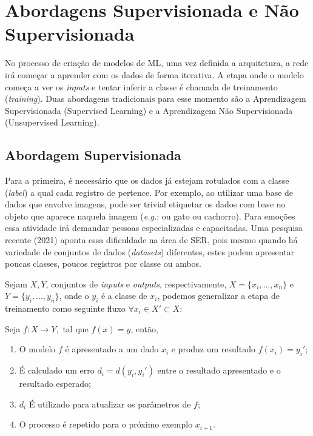 \section{Abordagens Supervisionada e Não Supervisionada}\label{sec:spvsup}

No processo de criação de modelos de \acrshort{ML}, uma vez definida a arquitetura, a rede irá começar a aprender com os dados de forma iterativa. A etapa onde o modelo começa a ver os \textit{inputs} e tentar inferir a classe é chamada de treinamento (\textit{training}). Duas abordagens tradicionais para esse momento são a Aprendizagem Supervisionada (Supervised Learning) e a Aprendizagem Não Supervisionada (Unsupervised Learning).

\subsection{Abordagem Supervisionada}

Para a primeira, é necessário que os dados já estejam rotulados com a classe (\textit{label}) a qual cada registro de pertence. Por exemplo, ao utilizar uma base de dados que envolve imagens, pode ser trivial etiquetar os dados com base no objeto que aparece naquela imagem (\textit{e.g.}: ou gato ou cachorro). Para emoções essa atividade irá demandar pessoas especializadas e capacitadas. Uma pesquisa~\cite{32} recente (2021) aponta essa dificuldade na área de \acrshort{SER}, pois mesmo quando há variedade de conjuntos de dados (\textit{datasets}) diferentes, estes podem apresentar poucas classes, poucos registros por classe ou ambos.

Sejam $X, Y$, conjuntos de \textit{inputs} e \textit{outputs}, respectivamente, $X=\{x_i, ..., x_n\}$ e $Y=\{y_i, ..., y_n\}$, onde o $y_i$ é a classe de $x_i$, podemos generalizar a etapa de treinamento como seguinte fluxo $\forall x_i \in X' \subset X$:

Seja $f: X \rightarrow Y,$ tal que $f(x) = y$, então,

\begin{enumerate}
    \item O modelo $f$ é apresentado a um dado $x_i$ e produz um resultado $f(x_i) = y_i'$;
    \item É calculado um erro $d_i = d(y_i, y_i')$ entre o resultado apresentado e o resultado esperado;
    \item $d_i$ É utilizado para atualizar os parâmetros de $f$;
    \item O processo é repetido para o próximo exemplo $x_{i+1}$.
\end{enumerate}

